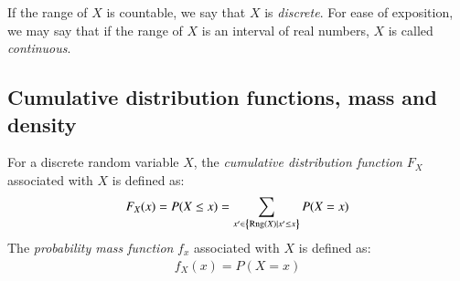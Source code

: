 \documentclass[nobib,nofonts]{tufte-handout}
\renewcommand{\markdef}[1]{\emph{#1}}
\begin{document}
If the range of $X$ is countable, we say that $X$ is \markdef{discrete}. For ease of
exposition, we may say that if the range of $X$ is an interval of real numbers, $X$ is
called \markdef{continuous}.

\subsection{Cumulative distribution functions, mass and density}

For a discrete random variable $X$, the \markdef{cumulative distribution function} $F_X$
associated with $X$ is defined as:
\begin{align*}
  F_X(x) = P(X \le x) = \sum_{x' \in \left\{\text{Rng}(X) \mid x' \le x\right\}} P(X = x)
\end{align*}
The \markdef{probability mass function} $f_x$ associated with $X$ is defined as:
\begin{align*}
  f_X(x) = P(X = x)
\end{align*}
\end{document}
